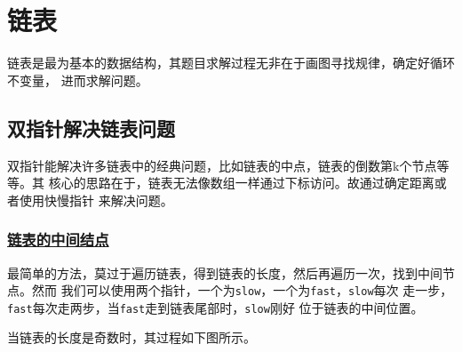 \documentclass[../../main.tex]{subfiles}
\begin{document}
\setchapterpreamble[u]{\margintoc}

\chapter{链表}

链表是最为基本的数据结构，其题目求解过程无非在于画图寻找规律，确定好循环不变量，
进而求解问题。

\section{双指针解决链表问题}

双指针能解决许多链表中的经典问题，比如链表的中点，链表的倒数第k个节点等等。其
核心的思路在于，链表无法像数组一样通过下标访问。故通过确定距离或者使用快慢指针
来解决问题。

\subsection{\href{https://leetcode.cn/problems/middle-of-the-linked-list/}{链表的中间结点}}
\label{subsec:middle-of-the-linked-list}

最简单的方法，莫过于遍历链表，得到链表的长度，然后再遍历一次，找到中间节点。然而
我们可以使用两个指针，一个为\texttt{slow}，一个为\texttt{fast}，\texttt{slow}每次
走一步，\texttt{fast}每次走两步，当\texttt{fast}走到链表尾部时，\texttt{slow}刚好
位于链表的中间位置。

当链表的长度是奇数时，其过程如下图所示。
\end{document}
